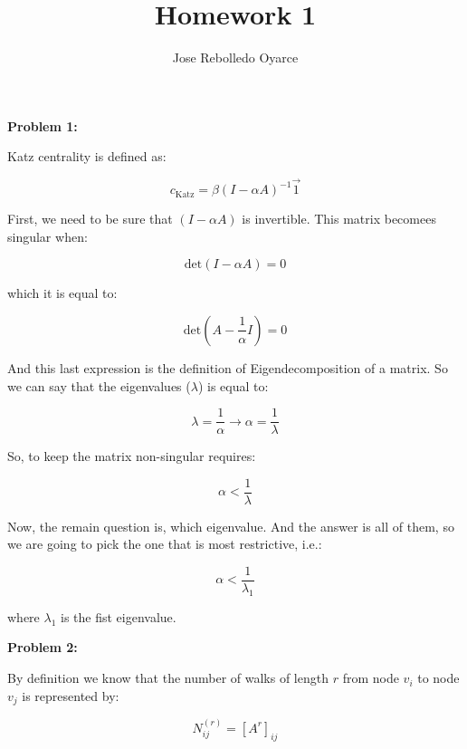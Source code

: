 \documentclass[11pt]{article}
\title{Homework 1}
\author{Jose Rebolledo Oyarce}
\begin{document}
\maketitle

\textbf{Problem 1:}

Katz centrality is defined as:

\begin{equation*}
    c_\textrm{Katz} = \beta (I - \alpha A)^{-1} \overrightarrow{1}
\end{equation*}

First, we need to be sure that $(I - \alpha A)$ is invertible. This matrix becomees singular when:

\begin{equation*}
    \textrm{det}(I - \alpha A) = 0
\end{equation*}

which it is equal to:

\begin{equation*}
    \textrm{det} \left( A - \frac{1}{\alpha} I \right) = 0
\end{equation*}

And this last expression is the definition of Eigendecomposition of a matrix. So we can say that the eigenvalues ($\lambda$) is equal to:

\begin{equation*}
    \lambda = \frac{1}{\alpha}  \longrightarrow \alpha = \frac{1}{\lambda}
\end{equation*}

So, to keep the matrix non-singular requires:

\begin{equation*}
    \alpha < \frac{1}{\lambda}
\end{equation*}

Now, the remain question is, which eigenvalue. And the answer is all of them, so we are going to pick the one that is most restrictive, i.e.:

\begin{equation*}
    \alpha < \frac{1}{\lambda_1 }
\end{equation*}

where $\lambda_1$ is the fist eigenvalue.

\clearpage


\textbf{Problem 2:}

By definition we know that the number of walks of length $r$ from node $v_i$ to node $v_j$ is represented by:

\begin{equation*}
    N_{ij}^{(r)} = [A^r]_{ij}
\end{equation*}
\end{document}
